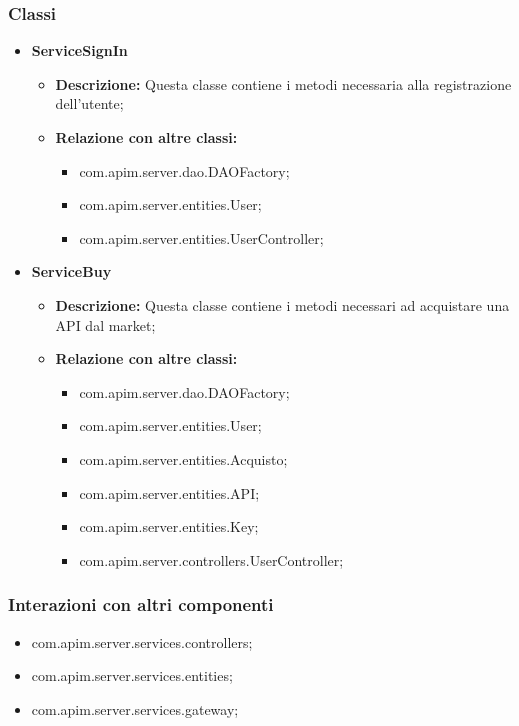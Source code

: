 {{{        \subsubsection{Classi}
        \begin{itemize} \itemsep1pt
          \item \textbf{ServiceSignIn}
          \begin{itemize}
            \item \textbf{Descrizione:} Questa classe contiene i metodi necessaria alla registrazione dell'utente;
            \item \textbf{Relazione con altre classi:}
            \begin{itemize}
              \item com.apim.server.dao.DAOFactory;
              \item com.apim.server.entities.User;
              \item com.apim.server.entities.UserController;
            \end{itemize}
          \end{itemize}
          \item \textbf{ServiceBuy}
          \begin{itemize}
            \item \textbf{Descrizione:} Questa classe contiene i metodi necessari ad acquistare una API dal market;
            \item \textbf{Relazione con altre classi:}
            \begin{itemize}
              \item com.apim.server.dao.DAOFactory;
              \item com.apim.server.entities.User;
              \item com.apim.server.entities.Acquisto;
              \item com.apim.server.entities.API;
              \item com.apim.server.entities.Key;
              \item com.apim.server.controllers.UserController;
            \end{itemize}
          \end{itemize}
       \end{itemize}
       \subsubsection{Interazioni con altri componenti}
          \begin{itemize}
            \item com.apim.server.services.controllers;
            \item com.apim.server.services.entities;
            \item com.apim.server.services.gateway;
          \end{itemize}    
  }
}}
